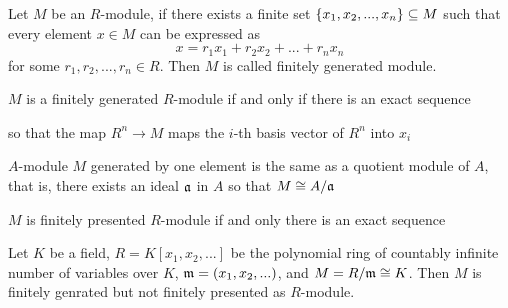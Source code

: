 \begin{definition}
	Let $M$ be an $R$-module, if there exists a finite set $\{x_1, x_2, ..., x_n\} \subseteq M$ such that every element $x \in M$ can be expressed as
	$$
		x = r_1 x_1 + r_2 x_2 + ... + r_n x_n
	$$
	for some $r_1, r_2, ..., r_n \in R$. Then $M$ is called finitely generated module.
\end{definition}

\begin{proposition}
	$M$ is a finitely generated $R$-module if and only if there is an exact sequence
	\begin{center}
	\end{center}
	so that the map $R^n \to M$ maps the $i$-th basis vector of $R^n$ into $x_i$
\end{proposition}

\begin{corollary}
	$A$-module $M$ generated by one element is the same as a quotient module of $A$, that is, there exists an ideal $\mathfrak{a}$ in $A$ so that $M \cong A / \mathfrak{a}$
\end{corollary}

\begin{definition}
	$M$ is finitely presented $R$-module if and only there is an exact sequence
	\begin{center}
	\end{center}
\end{definition}

\begin{remark}
	Let $K$ be a field, $R = K[x_1, x_2, ...]$ be the polynomial ring of countably infinite number of variables over $K$, $\mathfrak{m} = (x_1, x_2, ...)$, and $M = R / \mathfrak{m} \cong K$. Then
	$M$ is finitely genrated but not finitely presented as $R$-module.
	\begin{center}
	\end{center}
	
\end{remark}

